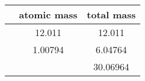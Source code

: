 \usepackage{booktabs}
\usepackage{siunitx}
\usepackage{chemformula}

  \begin{tabular}{lSS}
    \toprule
              & {atomic mass} & {total mass} \\
    \midrule
        &    12.011     & 12.011       \\
        &     1.00794   &  6.04764     \\
     &               & 30.06964     \\
    \bottomrule
  \end{tabular}
